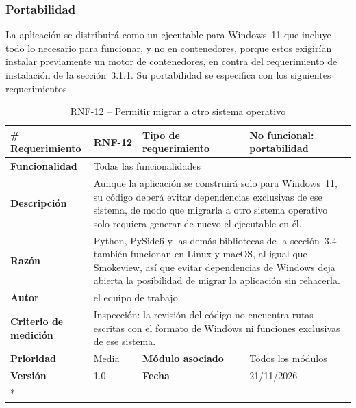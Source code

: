 \subsubsection{Portabilidad}
La aplicación se distribuirá como un ejecutable para Windows~11 que incluye todo lo necesario para funcionar, y no en contenedores, porque estos exigirían instalar previamente un motor de contenedores, en contra del requerimiento de instalación de la sección~3.1.1. Su portabilidad se especifica con los siguientes requerimientos.

\begin{longtable}{|p{\rqA}|p{\rqB}|p{\rqC}|p{\rqD}|}
  \caption{RNF-12 -- Permitir migrar a otro sistema operativo}\label{tab:rnf-12}\tabularnewline
  \hline
  \textbf{\# Requerimiento} & RNF-12 & \raggedright\textbf{Tipo de requerimiento} & No funcional: portabilidad\tabularnewline\hline
  \raggedright\textbf{Funcionalidad} & \multicolumn{3}{p{\rqBCD}|}{Todas las funcionalidades}\tabularnewline\hline
  \endfirsthead
  \textbf{Descripción} & \multicolumn{3}{p{\rqBCD}|}{Aunque la aplicación se construirá solo para Windows~11, su código deberá evitar dependencias exclusivas de ese sistema, de modo que migrarla a otro sistema operativo solo requiera generar de nuevo el ejecutable en él.}\tabularnewline\hline
  \textbf{Razón} & \multicolumn{3}{p{\rqBCD}|}{Python, PySide6 y las demás bibliotecas de la sección~3.4 también funcionan en Linux y macOS, al igual que Smokeview, así que evitar dependencias de Windows deja abierta la posibilidad de migrar la aplicación sin rehacerla.}\tabularnewline\hline
  \textbf{Autor} & \multicolumn{3}{p{\rqBCD}|}{el equipo de trabajo}\tabularnewline\hline
  \raggedright\textbf{Criterio de medición} & \multicolumn{3}{p{\rqBCD}|}{Inspección: la revisión del código no encuentra rutas escritas con el formato de Windows ni funciones exclusivas de ese sistema.}\tabularnewline\hline
  \textbf{Prioridad} & Media & \raggedright\textbf{Módulo asociado} & Todos los módulos\tabularnewline\hline
  \textbf{Versión} & 1.0 & \textbf{Fecha} & 21/11/2026\tabularnewline*\cline{1-4}
\end{longtable}


